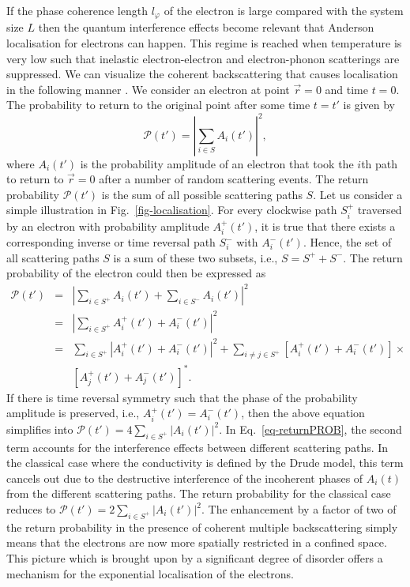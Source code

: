 If the phase coherence length $l_\varphi$ of the electron is large compared with the system size $L$ then the quantum interference effects become relevant that Anderson localisation for electrons can happen.  This regime is reached when temperature is very low such that inelastic electron-electron and electron-phonon scatterings are suppressed.
%
We can visualize the coherent backscattering that causes localisation in the following manner \cite{Ber83, Ber84}.  We consider an electron at point $\vec{r}=0$ and time $t=0$.  The probability to return to the original point after some time $t=t'$ is given by
%
\begin{equation}
\label{eq-returnPROB}
 \mathcal{P}(t') = \left|\sum_{i\in S}A_i(t')\right|^2,
\end{equation}
%
where $A_i(t')$ is the probability amplitude of an electron that took the $i$th path to return to $\vec{r}=0$ after a number of random scattering events.  The return probability $\mathcal{P}(t')$ is the sum of all possible scattering paths $S$.  Let us consider a simple illustration in Fig.~\ref{fig-localisation}.  For every clockwise path $S_i^+$ traversed by an electron with probability amplitude $A_i^+(t')$, it is true that there exists a corresponding inverse or time reversal path $S_i^-$ with $A_i^-(t')$.  Hence, the set of all scattering paths $S$ is a sum of these two subsets, i.e., $S=S^+ +S^-$.  The return probability of the electron could then be expressed as
%
\begin{eqnarray}
 \mathcal{P}(t')& = & \left|\sum_{i\in S^+}A_i(t') + \sum_{i\in S^-}A_i(t')\right|^2\nonumber\\
                & = & \left|\sum_{i\in S^+} A_i^+(t') + A_i^-(t')\right|^2\nonumber\\
		& = & \sum_{i\in S^+}\left|A_i^+(t') + A_i^-(t')\right|^2 + \sum_{i\neq j \in S^+}\left[A_i^+(t') + A_i^-(t')\right]\times \nonumber\\
		&   & \left[A_j^+(t') + A_j^-(t')\right]^*.
\end{eqnarray}
%
If there is time reversal symmetry such that the phase of the probability amplitude is preserved, i.e., $A_i^+(t')=A_i^-(t')$, then the above equation simplifies into $\mathcal{P}(t')=4\sum_{i\in S^+}\left| A_i(t') \right|^2 $.  In Eq.~\eqref{eq-returnPROB}, the second term accounts for the interference effects between different scattering paths.  In the classical case where the conductivity is defined by the Drude model, this term cancels out due to the destructive interference of the incoherent phases of $A_i(t)$ from the different scattering paths.  The return probability for the classical case reduces to $\mathcal{P}(t')=2\sum_{i\in S^+}\left| A_i(t') \right|^2 $.  The enhancement by a factor of two of the return probability in the presence of coherent multiple backscattering simply means that the electrons are now more spatially restricted in a confined space.  This picture which is brought upon by a significant degree of disorder offers a mechanism for the exponential localisation of the electrons.
